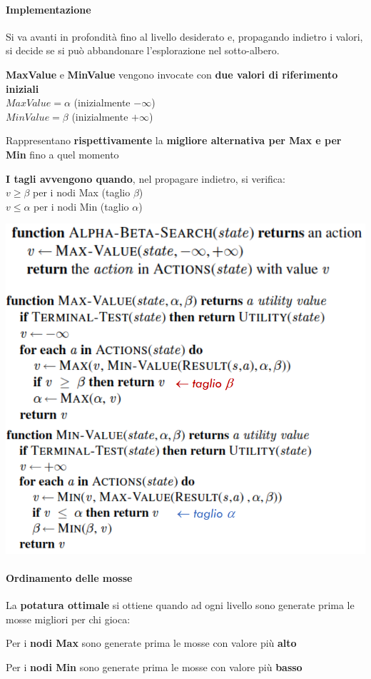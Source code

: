 \documentclass[10pt]{book}
\begin{document}
\paragraph{Implementazione} Si va avanti in profondità fino al livello desiderato e, propagando indietro i valori, si decide se si può abbandonare l'esplorazione nel sotto-albero.
\begin{list}{}{}
	\item \textbf{MaxValue} e \textbf{MinValue} vengono invocate con \textbf{due valori di riferimento iniziali}\\
	$MaxValue = \alpha$ (inizialmente $-\infty$)\\
	$MinValue = \beta$ (inizialmente $+\infty$)
	\item Rappresentano \textbf{rispettivamente} la \textbf{migliore alternativa per Max e per Min} fino a quel momento
	\item \textbf{I tagli avvengono quando}, nel propagare indietro, si verifica:\\
	$v \geq \beta$ per i nodi Max (taglio $\beta$)\\
	$v \leq \alpha$ per i nodi Min (taglio $\alpha$)
\end{list}
\pagebreak
\begin{center}
	\includegraphics[scale=0.5]{alphabetalag.png}
\end{center}
\paragraph{Ordinamento delle mosse} La \textbf{potatura ottimale} si ottiene quando ad ogni livello sono generate prima le mosse migliori per chi gioca:
\begin{list}{}{}
	\item Per i \textbf{nodi Max} sono generate prima le mosse con valore più \textbf{alto}
	\item Per i \textbf{nodi Min} sono generate prima le mosse con valore più \textbf{basso}
\end{list}
\end{document}
